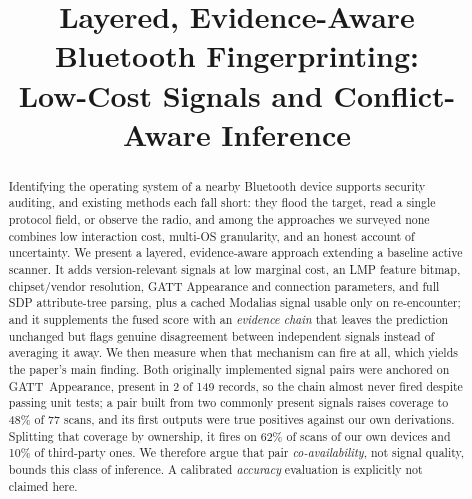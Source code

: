\documentclass[conference]{IEEEtran}
\begin{document}
\title{Layered, Evidence-Aware Bluetooth Fingerprinting:\\
Low-Cost Signals and Conflict-Aware Inference}

\author{
\and
{}
}

\maketitle

\begin{abstract}
Identifying the operating system of a nearby Bluetooth device supports
security auditing, and existing methods each fall short: they flood the
target, read a single protocol field, or observe the radio, and among the
approaches we surveyed none combines low interaction cost, multi-OS
granularity, and an honest account of uncertainty. We present a layered,
evidence-aware approach extending a baseline active scanner. It adds
version-relevant signals at low marginal cost, an LMP feature bitmap,
chipset/vendor resolution, GATT Appearance and connection parameters, and full
SDP attribute-tree parsing, plus a cached Modalias signal usable only on
re-encounter; and it supplements the fused score with an \emph{evidence chain}
that leaves the prediction unchanged but flags genuine disagreement between
independent signals instead of averaging it away. We then measure when that
mechanism can fire at all, which yields the paper's main finding. Both
originally implemented signal pairs were anchored on GATT~Appearance, present
in 2 of 149 records, so the chain almost never fired despite passing unit
tests; a pair built from two commonly present signals raises coverage to 48\%
of 77 scans, and its first outputs were true positives against our own
derivations. Splitting that coverage by ownership, it fires on 62\% of scans
of our own devices and 10\% of third-party ones. We therefore argue that pair
\emph{co-availability}, not signal quality, bounds this class of inference. A
calibrated \emph{accuracy} evaluation is explicitly not claimed here.
\end{abstract}
\end{document}

